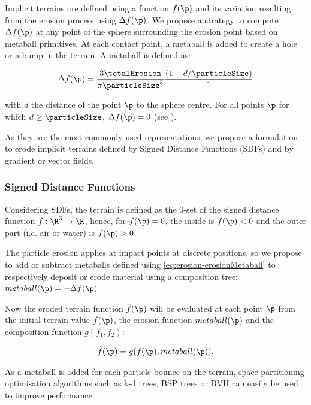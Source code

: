 Implicit terrains are defined using a function $f(\p)$ and its variation resulting from the erosion process using $\Delta f(\p)$.  
We propose a strategy to compute $\Delta f(\p)$ at any point of the sphere surrounding the erosion point based on metaball primitives. At each contact point, a metaball is added to create a hole or a bump in the terrain. A metaball is defined as: 

\begin{align}
    \label{eq:erosion-erosionMetaball}
    \Delta f(\p) = \frac{3 \totalErosion}{\pi \particleSize^3} \frac{(1 - d/\particleSize)}{1}
\end{align}

with $d$ the distance of the point $\p$ to the sphere centre. For all points $\p$ for which $d \geq \particleSize$, $\Delta f(\p) = 0$ (see ).

As they are the most commonly used representations, we propose a formulation to erode implicit terrains defined by Signed Distance Functions (SDFs) and by gradient or vector fields.

\subsubsection{Signed Distance Functions}
\label{sec:erosion-application_on_sdf}

Considering SDFs, the terrain is defined as the 0-set of the signed distance function $f: \R^3 \to \R$, hence, for $f(\p) = 0$, the inside is $f(\p) < 0$ and the outer part (i.e. air or water) is $f(\p) > 0$. 

The particle erosion applies at impact points at discrete positions, so we propose to add or subtract metaballs defined using \cref{eq:erosion-erosionMetaball} to respectively deposit or erode material using a composition tree:
 $metaball(\p) = -\Delta f(\p)$.

Now the eroded terrain function $\Tilde{f}(\p)$ will be evaluated at each point $\p$ from the initial terrain value $f(\p)$, the erosion function $metaball(\p)$ and the composition function $g(f_1, f_2)$:

\begin{align}
    \Tilde{f}(\p) = g(f(\p), metaball(\p)).  \nonumber
\end{align}

As a metaball is added for each particle bounce on the terrain, space partitioning optimisation algorithms such as k-d trees, BSP trees or BVH can easily be used to improve performance.

